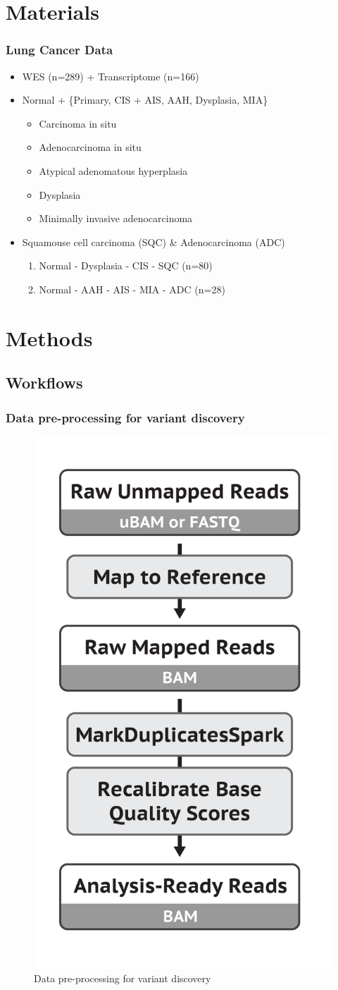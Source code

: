 \documentclass{beamer}
\begin{document}
    \section{Materials}
    \begin{frame}
        \frametitle{Lung Cancer Data}

        \begin{itemize}
            \item WES (n=289) + Transcriptome (n=166)
            \item Normal + \{Primary, CIS + AIS, AAH, Dysplasia, MIA\}
            \begin{itemize}
                \item Carcinoma in situ
                \item Adenocarcinoma in situ
                \item Atypical adenomatous hyperplasia
                \item Dysplasia
                \item Minimally invasive adenocarcinoma
            \end{itemize}
            \item Squamouse cell carcinoma (SQC) \& Adenocarcinoma (ADC)
            \begin{enumerate}
                \item Normal - Dysplasia - CIS - SQC (n=80)
                \item Normal - AAH - AIS - MIA - ADC (n=28)
            \end{enumerate}
        \end{itemize}
    \end{frame}

    \section{Methods}
    \subsection{Workflows}
    \begin{frame}
        \frametitle{Data pre-processing for variant discovery}

        \begin{figure}
            \includegraphics[width=0.3 \linewidth]{figures/Workflow/mapping.png}
            \caption{Data pre-processing for variant discovery \protect\cite{gatk1, gatk2}}
        \end{figure}
    \end{frame}
\end{document}

